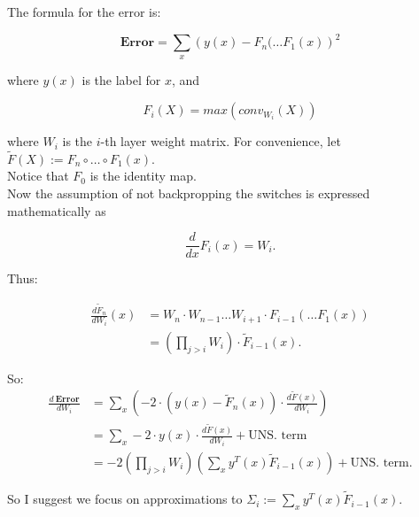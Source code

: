 \documentclass[11pt]{article}
\title{}
\author{}
\date{}
\begin{document}

\maketitle

\thispagestyle{empty}

The formula for the error is:

$$\textbf{Error} = \sum_{x} \left (y(x) - F_n( \ldots F_1(x) \right)^2$$

where $y(x)$ is the label for $x$, and 

$$F_i(X) = max(conv_{W_i}(X))$$

where $W_i$ is the $i$-th layer weight matrix.   For convenience, let $\tilde{F}(X) := F_n \circ \ldots \circ F_1 (x)$. \\

Notice that $F_0$ is the identity map. \\

Now the assumption of not backpropping the switches is expressed mathematically as

$$\frac{d}{dx}F_i(x) = W_i.$$

Thus:

\begin{eqnarray*}
\frac{d \tilde{F}_n}{d W_i}(x) & = W_n \cdot W_{n-1} \ldots W_{i+1} \cdot F_{i-1}( \ldots F_1(x)) \\
                            & = \left( \prod_{j > i} W_i \right) \cdot \tilde{F}_{i-1}(x).
\end{eqnarray*}                 
                 
So:                        
\begin{eqnarray*}
\frac{d\ \mathbf{Error}}{d W_i} & = \sum_x \left ( -2 \cdot (y(x) - \tilde{F}_n(x)) \cdot \frac{d\tilde{F}(x)}{dW_i} \right ) \\     
                      & = \sum_x -2 \cdot y(x) \cdot  \frac{d\tilde{F}(x)}{dW_i} + \text{UNS. term} \\
                      & = -2 \left(\prod_{j > i} W_i \right) \left(\sum_x y^T(x) \tilde{F}_{i-1}(x) \right) + \text{UNS. term}.
\end{eqnarray*}

So I suggest we focus on approximations to $\Sigma_{i} := \sum_x y^T(x) \tilde{F}_{i-1}(x)$.

\newpage

\footnotesize{

\linespread{0.9}

}
\end{document}
